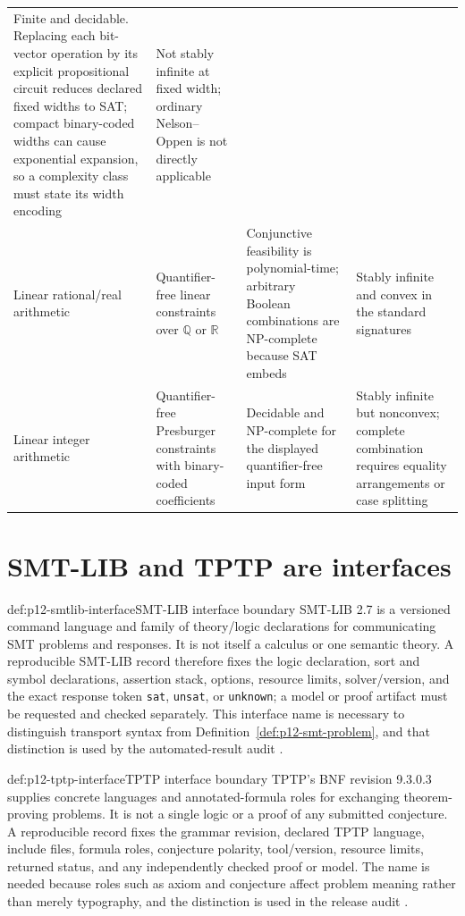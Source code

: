 \begin{landscape}
\begin{longtable}{@{}p{.95in}p{1.90in}p{2.15in}p{2.15in}@{}}
Finite and decidable.  Replacing each bit-vector operation by its explicit
propositional circuit reduces declared fixed widths to SAT;
compact binary-coded widths can cause exponential expansion, so a complexity
class must state its width encoding & Not stably infinite at fixed width;
ordinary Nelson--Oppen is not directly applicable \cite{SMTLIB2025} \\
\addlinespace
Linear rational/real arithmetic & Quantifier-free linear constraints over
\(\mathbb Q\) or \(\mathbb R\) & Conjunctive feasibility is polynomial-time;
arbitrary Boolean combinations are NP-complete because SAT embeds &
Stably infinite and convex in the standard signatures
\cite{DutertreDeMoura2006} \\ \addlinespace
Linear integer arithmetic & Quantifier-free Presburger constraints with
binary-coded coefficients & Decidable and NP-complete for the displayed
quantifier-free input form & Stably infinite but nonconvex; complete
combination requires equality arrangements or case splitting \\ \bottomrule
\end{longtable}
\endgroup
\end{landscape}

\section{SMT-LIB and TPTP are interfaces}

\begin{hbdefinition}{def:p12-smtlib-interface}{SMT-LIB interface boundary}
SMT-LIB 2.7 is a versioned command language and family of theory/logic
declarations for communicating SMT problems and responses.  It is not itself
a calculus or one semantic theory.  A reproducible SMT-LIB record therefore
fixes the logic declaration, sort and symbol declarations, assertion stack,
options, resource limits, solver/version, and the exact response token
\texttt{sat}, \texttt{unsat}, or \texttt{unknown}; a model or proof artifact
must be requested and checked separately.  This interface name is necessary
to distinguish transport syntax from Definition~\ref{def:p12-smt-problem},
and that distinction is used by the automated-result audit
\cite{SMTLIB2025}.
\end{hbdefinition}

\begin{hbdefinition}{def:p12-tptp-interface}{TPTP interface boundary}
TPTP's BNF revision 9.3.0.3 supplies concrete languages and annotated-formula
roles for exchanging theorem-proving problems.  It is not a single logic or a
proof of any submitted conjecture.  A reproducible record fixes the grammar
revision, declared TPTP language, include files, formula roles, conjecture polarity,
tool/version, resource limits, returned status, and any independently checked
proof or model.  The name is needed because roles such as axiom and conjecture
affect problem meaning rather than merely typography, and the distinction is
used in the release audit \cite{TPTP}.
\end{hbdefinition}

